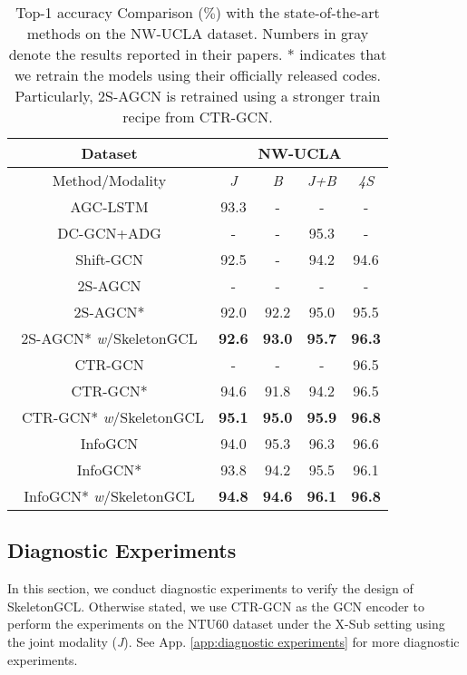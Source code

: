\documentclass{article} \usepackage{iclr2023_conference,times}
\begin{document}
\begin{table}[h]
    \centering
    \scriptsize
    \caption{Top-1 accuracy Comparison ($\%$) with the state-of-the-art methods on the NW-UCLA dataset. Numbers in gray denote the results reported in their papers. * indicates that we retrain the models using their officially released codes. Particularly, 2S-AGCN is retrained using a stronger train recipe from CTR-GCN.}
    \begin{tabular}{c||c|c|c|c}
\rowcolor{gray!30} Dataset & \multicolumn{4}{c}{NW-UCLA} \\\hline
        \rowcolor{gray!30} Method/Modality & \textit{J} & \textit{B} & \textit{J+B} & \textit{4S} \\
        \hline \hline
        AGC-LSTM \citep{AGC-LSTM} & 93.3 & - & - & - \\
        DC-GCN+ADG \citep{decouplinggcn} & - & - & 95.3 & - \\ 
        Shift-GCN \citep{shiftgcn} & 92.5 & - & 94.2 & 94.6 \\
        \hline \hline 
        {\color{gray}2S-AGCN \citep{2SAGCN}} & - & - & - & - \\
        2S-AGCN* \citep{2SAGCN} & 92.0 & 92.2 & 95.0 & 95.5 \\
        2S-AGCN* \textit{w}/SkeletonGCL & \textbf{92.6} & \textbf{93.0} & \textbf{95.7} & \textbf{96.3} \\
        \hline \hline
        {\color{gray} CTR-GCN \citep{CTRGCN}} & - & - & - & {\color{gray}96.5} \\
        CTR-GCN* \citep{CTRGCN} & 94.6 & 91.8 & 94.2 & 96.5 \\\
        CTR-GCN* \textit{w}/SkeletonGCL & \textbf{95.1} & \textbf{95.0} & \textbf{95.9 }& \textbf{96.8} \\
        \hline \hline
        {\color{gray}InfoGCN \citep{INFOGCN}} & {\color{gray}94.0} & {\color{gray}95.3} & {\color{gray}96.3} & {\color{gray}96.6} \\
        InfoGCN* \citep{INFOGCN} & 93.8 & 94.2 & 95.5 & 96.1 \\
        InfoGCN* \textit{w}/SkeletonGCL & \textbf{94.8} & \textbf{94.6} & \textbf{96.1} & \textbf{96.8} \\
        \hline
    \end{tabular}
    \label{tab:sota nwucla}
\end{table}

\subsection{Diagnostic Experiments}
\label{exp:dia}
In this section, we conduct diagnostic experiments to verify the design of SkeletonGCL. Otherwise stated, we use CTR-GCN as the GCN encoder to perform the experiments on the NTU60 dataset under the X-Sub setting using the joint modality (\textit{J}). See App. \ref{app:diagnostic experiments} for more diagnostic experiments. 
\end{document}
